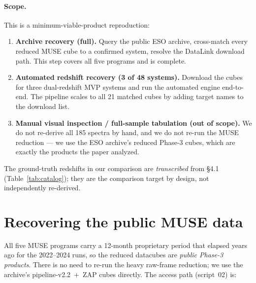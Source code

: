 \documentclass[11pt,letterpaper]{article}
\newcommand{\muse}{\textsc{MUSE}}
\newcommand{\zap}{\textsc{ZAP}}
\begin{document}
\paragraph{Scope.} This is a minimum-viable-product reproduction:
\begin{enumerate}
\item \textbf{Archive recovery (full).} Query the public ESO archive, cross-match
      every reduced \muse{} cube to a confirmed system, resolve the DataLink
      download path. This step covers all five programs and is complete.
\item \textbf{Automated redshift recovery (3 of 48 systems).} Download the cubes
      for three dual-redshift MVP systems and run the automated engine end-to-end.
      The pipeline scales to all 21 matched cubes by adding target names to the
      download list.
\item \textbf{Manual visual inspection / full-sample tabulation (out of scope).}
      We do not re-derive all 185 spectra by hand, and we do not re-run the \muse{}
      reduction --- we use the ESO archive's reduced Phase-3 cubes, which are
      exactly the products the paper analyzed.
\end{enumerate}
The ground-truth redshifts in our comparison are \emph{transcribed} from
\citet{lin2025foundry4} \S4.1 (Table~\ref{tab:catalog}); they are the comparison
target by design, not independently re-derived.

\section{Recovering the public MUSE data}

All five \muse{} programs carry a 12-month proprietary period that elapsed years
ago for the 2022--2024 runs, so the reduced datacubes are \emph{public Phase-3
products}. There is no need to re-run the heavy raw-frame reduction; we use the
archive's pipeline-v2.2~+~\zap{} cubes directly. The access path (script~02) is:
\end{document}
